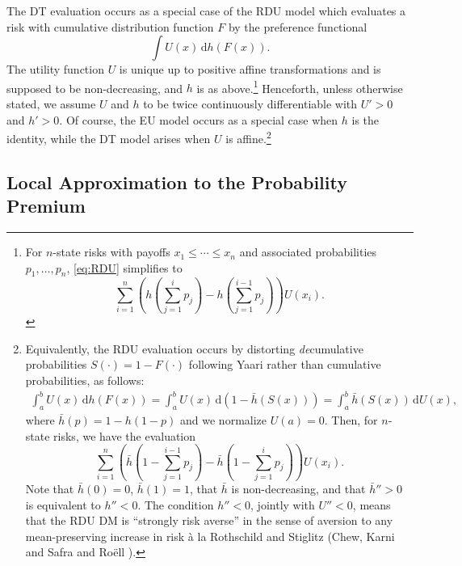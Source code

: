 \documentclass[11pt]{article}
\begin{document}
The DT evaluation occurs as a special case of the RDU model
which evaluates a risk with cumulative distribution function $F$ by the preference functional
\begin{equation}
\int U(x) \,\mathrm{d}h\left(F(x)\right).
\label{eq:RDU}
\end{equation}
The utility function $U$ is unique up to positive affine transformations
and is supposed to be non-decreasing,
and $h$ is as above.\footnote{For $n$-state risks with payoffs $x_{1}\leq\cdots\leq x_{n}$
and associated probabilities $p_{1},\ldots,p_{n}$,
\eqref{eq:RDU} simplifies to
\begin{equation*}
\sum_{i=1}^{n}\left(h\left(\sum_{j=1}^{i}p_{j}\right)-h\left(\sum_{j=1}^{i-1}p_{j}\right)\right)U(x_{i}).
\end{equation*}}
Henceforth, unless otherwise stated, we assume $U$ and $h$ to be twice continuously differentiable
with $U'>0$ and $h'>0$.
Of course, the EU model occurs as a special case when $h$ is the identity,
while the DT model arises when $U$ is affine.\footnote{Equivalently,
the RDU evaluation occurs by distorting \textit{de}cumulative probabilities $S(\cdot)=1-F(\cdot)$
following Yaari \cite{Y87}
rather than cumulative probabilities, as follows:
\begin{align*}
\int_{a}^{b} U(x) \,\mathrm{d}h\left(F(x)\right)
=\int_{a}^{b} U(x) \,\mathrm{d}\left(1-\bar{h}\left(S(x)\right)\right)
=\int_{a}^{b} \bar{h}\left(S(x)\right)\,\mathrm{d}U(x) ,
\end{align*}
where $\bar{h}(p)=1-h(1-p)$ and we normalize $U(a)=0$.
Then, for $n$-state risks, we have the evaluation
\begin{equation*}
\sum_{i=1}^{n}\left(\bar{h}\left(1-\sum_{j=1}^{i-1}p_{j}\right)-\bar{h}\left(1-\sum_{j=1}^{i}p_{j}\right)\right)U(x_{i}).
\end{equation*}
Note that $\bar{h}(0)=0$, $\bar{h}(1)=1$,
that $\bar{h}$ is non-decreasing, 
and that $\bar{h}''>0$ is equivalent to $h''<0$.
The condition $h''<0$, jointly with $U''<0$,
means that the RDU DM is ``strongly risk averse'' in the sense of aversion to any mean-preserving increase in risk \`a la Rothschild and Stiglitz \cite{RS70}
(Chew, Karni and Safra \cite{CKS87} and Ro\"ell \cite{R87}).}

\subsection{Local Approximation to the Probability Premium}\label{sec:localappRDU}
\end{document}

